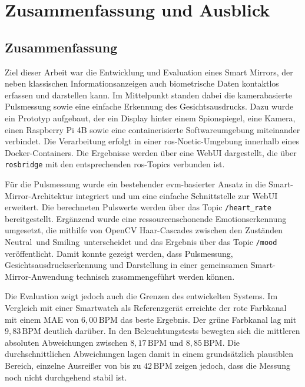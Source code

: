 \chapter{Zusammenfassung und Ausblick}

\section{Zusammenfassung}

Ziel dieser Arbeit war die Entwicklung und Evaluation eines Smart Mirrors, der neben klassischen Informationsanzeigen auch biometrische Daten kontaktlos erfassen und darstellen kann. Im Mittelpunkt standen dabei die kamerabasierte Pulsmessung sowie eine einfache Erkennung des Gesichtsausdrucks. Dazu wurde ein Prototyp aufgebaut, der ein Display hinter einem Spionspiegel, eine Kamera, einen Raspberry Pi 4B sowie eine containerisierte Softwareumgebung miteinander verbindet. Die Verarbeitung erfolgt in einer \ac{ros}-Noetic-Umgebung innerhalb eines Docker-Containers. Die Ergebnisse werden über eine WebUI dargestellt, die über \texttt{rosbridge} mit den entsprechenden \ac{ros}-Topics verbunden ist.

Für die Pulsmessung wurde ein bestehender \ac{evm}-basierter Ansatz in die Smart-Mirror-Architektur integriert und um eine einfache Schnittstelle zur WebUI erweitert. Die berechneten Pulswerte werden über das Topic \texttt{/heart\_rate} bereitgestellt. Ergänzend wurde eine ressourcenschonende Emotionserkennung umgesetzt, die mithilfe von OpenCV Haar-Cascades zwischen den Zuständen \glqq Neutral\grqq\ und \glqq Smiling\grqq\ unterscheidet und das Ergebnis über das Topic \texttt{/mood} veröffentlicht. Damit konnte gezeigt werden, dass Pulsmessung, Gesichtsausdruckserkennung und Darstellung in einer gemeinsamen Smart-Mirror-Anwendung technisch zusammengeführt werden können.

Die Evaluation zeigt jedoch auch die Grenzen des entwickelten Systems. Im Vergleich mit einer Smartwatch als Referenzgerät erreichte der rote Farbkanal mit einem MAE von \(6{,}00\,\mathrm{BPM}\) das beste Ergebnis. Der grüne Farbkanal lag mit \(9{,}83\,\mathrm{BPM}\) deutlich darüber. In den Beleuchtungstests bewegten sich die mittleren absoluten Abweichungen zwischen \(8{,}17\,\mathrm{BPM}\) und \(8{,}85\,\mathrm{BPM}\). Die durchschnittlichen Abweichungen lagen damit in einem grundsätzlich plausiblen Bereich, einzelne Ausreißer von bis zu \(42\,\mathrm{BPM}\) zeigen jedoch, dass die Messung noch nicht durchgehend stabil ist.

